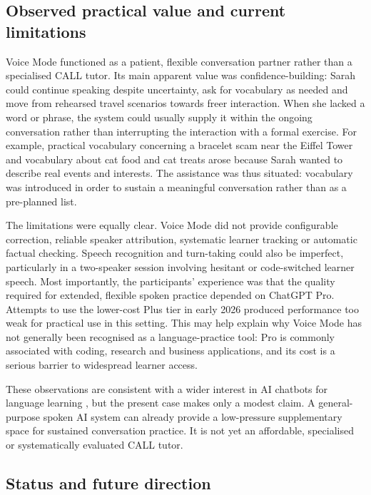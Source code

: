 \subsection{Observed practical value and current limitations}

Voice Mode functioned as a patient, flexible conversation partner rather than
a specialised CALL tutor. Its main apparent value was confidence-building:
Sarah could continue speaking despite uncertainty, ask for vocabulary as
needed and move from rehearsed travel scenarios towards freer interaction.
When she lacked a word or phrase, the system could usually supply it within the
ongoing conversation rather than interrupting the interaction with a formal
exercise. For example, practical vocabulary concerning a bracelet scam near
the Eiffel Tower and vocabulary about cat food and cat treats arose because
Sarah wanted to describe real events and interests. The assistance was thus
situated: vocabulary was introduced in order to sustain a meaningful
conversation rather than as a pre-planned list.

The limitations were equally clear. Voice Mode did not provide configurable
correction, reliable speaker attribution, systematic learner tracking or
automatic factual checking. Speech recognition and turn-taking could also be
imperfect, particularly in a two-speaker session involving hesitant or
code-switched learner speech. Most importantly, the participants' experience
was that the quality required for extended, flexible spoken practice depended
on ChatGPT Pro. Attempts to use the lower-cost Plus tier in early 2026 produced
performance too weak for practical use in this setting. This may help explain
why Voice Mode has not generally been recognised as a language-practice tool:
Pro is commonly associated with coding, research and business applications,
and its cost is a serious barrier to widespread learner access.

These observations are consistent with a wider interest in AI chatbots for
language learning \citep{KocSavas2025}, but the present case makes only a
modest claim. A general-purpose spoken AI system can already provide a
low-pressure supplementary space for sustained conversation practice. It is
not yet an affordable, specialised or systematically evaluated CALL tutor.

\subsection{Status and future direction}

